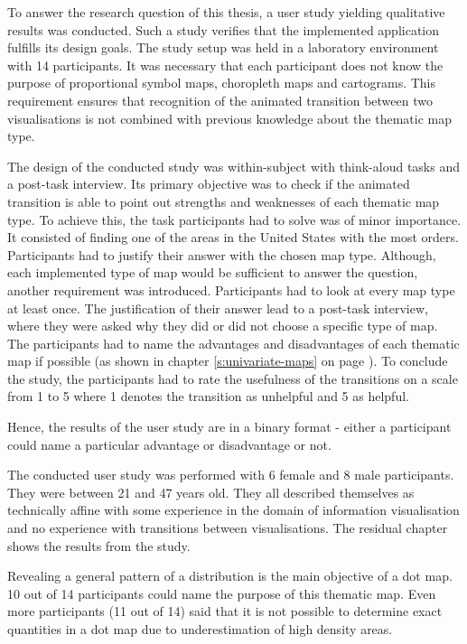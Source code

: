 To answer the research question of this thesis, a user study yielding qualitative results was conducted. Such a study verifies that the implemented application fulfills its design goals.
The study setup was held in a laboratory environment with 14 participants. It was necessary that each participant does not know the purpose of proportional symbol maps, choropleth maps and cartograms. This requirement ensures that recognition of the animated transition between two visualisations is not combined with previous knowledge about the thematic map type.

The design of the conducted study was within-subject with think-aloud tasks and a post-task interview. Its primary objective was to check if the animated transition is able to point out strengths and weaknesses of each thematic map type. To achieve this, the task participants had to solve was of minor importance. It consisted of finding one of the areas in the United States with the most orders. Participants had to justify their answer with the chosen map type. Although, each implemented type of map would be sufficient to answer the question, another requirement was introduced. Participants had to look at every map type at least once. The justification of their answer lead to a post-task interview, where they were asked why they did or did not choose a specific type of map. The participants had to name the advantages and disadvantages of each thematic map if possible (as shown in chapter \ref{s:univariate-maps} on page \pageref{s:univariate-maps}).
To conclude the study, the participants had to rate the usefulness of the transitions on a scale from 1 to 5 where 1 denotes the transition as unhelpful and 5 as helpful.

Hence, the results of the user study are in a binary format - either a participant could name a particular advantage or disadvantage or not.

The conducted user study was performed with 6 female and 8 male participants. They were between 21 and 47 years old. They all described themselves as technically affine with some experience in the domain of information visualisation and no experience with transitions between visualisations. The residual chapter shows the results from the study.

Revealing a general pattern of a distribution is the main objective of a dot map. 10 out of 14 participants could name the purpose of this thematic map. Even more participants (11 out of 14) said that it is not possible to determine exact quantities in a dot map due to underestimation of high density areas.

